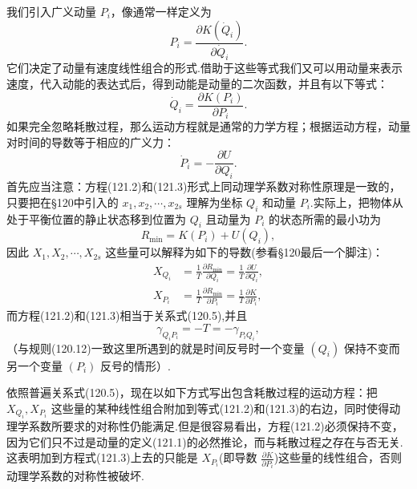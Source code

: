 我们引入广义动量 $P_i$，像通常一样定义为
\begin{equation}
  P_i=\frac{\partial K(\dot{Q}_i)}{\partial\dot{Q}_i}.
\end{equation}
它们决定了动量有速度线性组合的形式.借助于这些等式我们又可以用动量来表示速度，代入动能的表达式后，得到动能是动量的二次函数，并且有以下等式：
\begin{equation}
  \dot{Q}_i=\frac{\partial K(P_i)}{\partial P_i}.
\end{equation}
如果完全忽略耗散过程，那么运动方程就是通常的力学方程；根据运动方程，动量对时间的导数等于相应的广义力：
\begin{equation}
  \dot{P}_i=-\frac{\partial U}{\partial Q_i}.
\end{equation}
首先应当注意：方程(121.2)和(121.3)形式上同动理学系数对称性原理是一致的，只要把在§120中引入的 $x_1,x_2,\cdots,x_{2s}$ 理解为坐标 $Q_i$ 和动量 $P_i$.实际上，把物体从处于平衡位置的静止状态移到位置为 $Q_i$ 且动量为 $P_i$ 的状态所需的最小功为
\begin{equation*}
  R_{\min}=K(P_i)+U(Q_i),
\end{equation*}
因此 $X_1,X_2,\cdots,X_{2s}$ 这些量可以解释为如下的导数(参看§120最后一个脚注)：
\begin{equation*}
\begin{aligned}
  X_{Q_i}&=\frac{1}{T}\frac{\partial R_{\min}}{\partial Q_i}
  =\frac{1}{T}\frac{\partial U}{\partial Q_i},\\
  X_{P_i}&=\frac{1}{T}\frac{\partial R_{\min}}{\partial P_i}
  =\frac{1}{T}\frac{\partial K}{\partial P_i},
\end{aligned}
\end{equation*}
而方程(121.2)和(121.3)相当于关系式(120.5),并且
\begin{equation*}
  \gamma_{Q_iP_i}=-T=-\gamma_{P_iQ_i},
\end{equation*}
（与规则(120.12)一致这里所遇到的就是时间反号时一个变量 $(Q_i)$ 保持不变而另一个变量 $(P_i)$ 反号的情形）.

依照普遍关系式(120.5)，现在以如下方式写出包含耗散过程的运动方程：把 $X_{Q_i},X_{P_i}$ 这些量的某种线性组合附加到等式(121.2)和(121.3)的右边，同时使得动理学系数所要求的对称性仍能满足.但是很容易看出，方程(121.2)必须保持不变，因为它们只不过是动量的定义(121.1)的必然推论，而与耗散过程之存在与否无关.这表明加到方程式(121.3)上去的只能是 $X_{P_i}$(即导数 $\frac{\partial K}{\partial P_i}$)这些量的线性组合，否则动理学系数的对称性被破坏.


